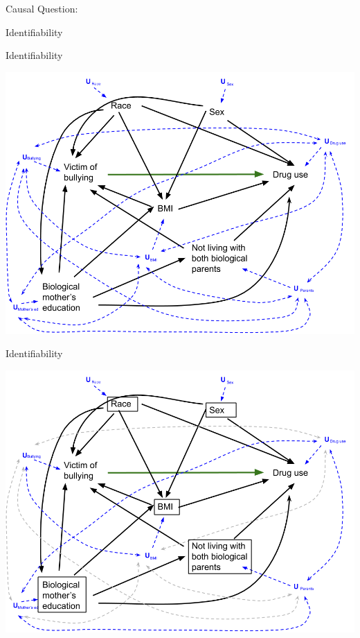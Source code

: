 \documentclass[ignorenonframetext,]{beamer}
\begin{document}
\begin{frame}{Causal Question:}
\begin{block}{Identifiability}
\end{block}

\begin{block}{Identifiability}

\includegraphics[width=1\linewidth]{DAG Causal Final Project_reduced covariates with Us_reality}

\end{block}

\begin{block}{Identifiability}

\includegraphics[width=1\linewidth]{DAG Causal Final Project_reduced covariates with Us_convenience}

\end{block}


\end{frame}
\end{document}
